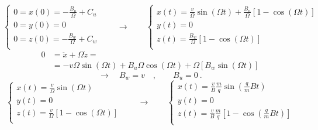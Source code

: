 \begin{itemize}
\begin{itemize}
\begin{equation}
            \begin{cases}
                0 = x(0) = - \frac{B_u}{\Omega} + C_u \\
                0 = y(0) = 0 \\
                0 = z(0) = - \frac{B_w}{\Omega} + C_w \\
            \end{cases} \qquad \rightarrow \qquad
            \begin{cases}
                x(t) = \frac{v}{\Omega} \sin (\Omega t) + \frac{B_u}{\Omega} \left[ 1 - \cos (\Omega t) \right] \\
                y(t) = 0 \\
                z(t) = \frac{B_w}{\Omega} \left[ 1 - \cos (\Omega t) \right] \\
            \end{cases} 
            \end{equation}
            \begin{equation}
            \begin{aligned}
                0 & = \ddot{x} + \Omega \dot{z} = \\
                  & = - v \Omega \sin(\Omega t) + B_u \Omega \cos(\Omega t) + \Omega \left[ B_w \sin(\Omega t) \right]
            \end{aligned}
            \end{equation}
            \begin{equation}
               \rightarrow \quad B_w = v \quad , \qquad B_u = 0 \ .
            \end{equation}
            \begin{equation}
            \begin{cases}
                x(t) = \frac{v}{\Omega} \sin (\Omega t) \\ 
                y(t) = 0 \\
                z(t) = \frac{v}{\Omega} \left[ 1 - \cos (\Omega t) \right] \\
            \end{cases} \qquad \rightarrow \qquad
            \begin{cases}
                x(t) = \frac{v}{B} \frac{m}{q} \sin \left(\frac{q}{m} B t \right) \\ 
                y(t) = 0 \\
                z(t) = \frac{v}{B} \frac{m}{q} \left[ 1 - \cos \left(\frac{q}{m} B t \right) \right] \\
            \end{cases}
            \end{equation}
    \end{itemize}
\end{itemize}


